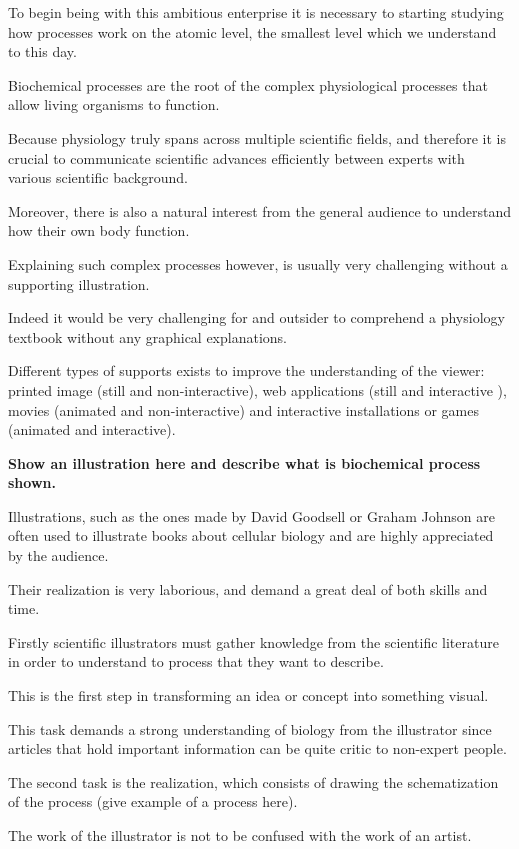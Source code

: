 To begin being with this ambitious enterprise it is necessary to starting studying how processes work on the atomic level, the smallest level which we  understand to this day.

Biochemical processes are the root of the complex physiological processes that allow living organisms to function.

Because physiology truly spans across multiple scientific fields, and therefore it is crucial to communicate scientific advances efficiently between experts with various scientific background.

Moreover, there is also a natural interest from the general audience to understand how their own body function.

Explaining such complex processes however, is usually very challenging without a supporting illustration.


Indeed it would be very challenging for and outsider to comprehend a physiology textbook without any graphical explanations.

Different types of supports exists to improve the understanding of the viewer: printed image (still and non-interactive), web applications (still and interactive ), movies (animated and non-interactive) and interactive installations or games (animated and interactive).

\textbf{Show an illustration here and describe what is biochemical process shown.}

Illustrations, such as the ones made by David Goodsell or Graham Johnson are often used to illustrate books about cellular biology and are highly appreciated by the audience.

Their realization is very laborious, and demand a great deal of both skills and time.

Firstly scientific illustrators must gather knowledge from the scientific literature in order to understand to process that they want to describe.

This is the first step in transforming an idea or concept into something visual.

This task demands a strong understanding of biology from the illustrator since articles that hold important information can be quite critic to non-expert people.

The second task is the realization, which consists of drawing the schematization of the process (give example of a process here).

The work of the illustrator is not to be confused with the work of an artist.

